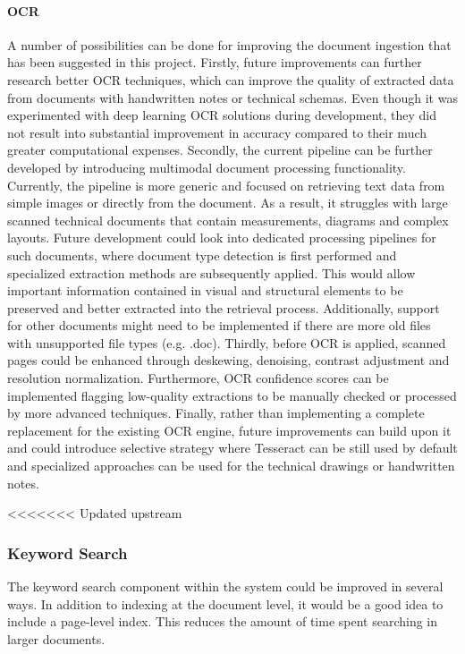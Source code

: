 \paragraph{OCR}
A number of possibilities can be done for improving the document ingestion that has been suggested in this project.
Firstly, future improvements can further research better OCR techniques, which can improve the quality of extracted data from documents with handwritten notes or technical schemas. Even though it was experimented with deep learning OCR solutions during development, they did not result into substantial improvement in accuracy compared to their much greater computational expenses.
Secondly, the current pipeline can be further developed by introducing multimodal document processing functionality. Currently, the pipeline is more generic and focused on retrieving text data from simple images or directly from the document. As a result, it struggles with large scanned technical documents that contain measurements, diagrams and complex layouts. Future development could look into dedicated processing pipelines for such documents, where document type detection is first performed and specialized extraction methods are subsequently applied. This would allow important information contained in visual and structural elements to be preserved and better extracted into the retrieval process. Additionally, support for other documents might need to be implemented if there are more old files with unsupported file types (e.g. .doc).
Thirdly, before OCR is applied, scanned pages could be enhanced through deskewing, denoising, contrast adjustment and resolution normalization. Furthermore, OCR confidence scores can be implemented flagging low-quality extractions to be manually checked or processed by more advanced techniques. Finally, rather than implementing a complete replacement for the existing OCR engine, future improvements can build upon it and could introduce selective strategy where Tesseract can be still used by default and specialized approaches can be used for the technical drawings or handwritten notes.

<<<<<<< Updated upstream
\subsubsection{Keyword Search}
The keyword search component within the system could be improved in several ways. In addition to indexing at the document level, it would be a good idea to include a page-level index. This reduces the amount of time spent searching in larger documents. 

